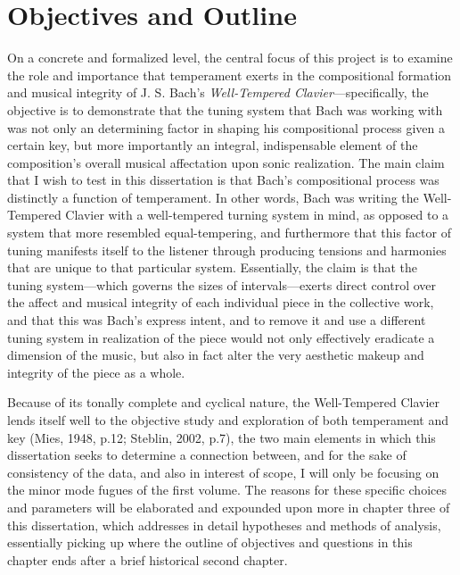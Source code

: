     \section{Objectives and Outline}\label{objectives-and-outline}

On a concrete and formalized level, the central focus of this project is
to examine the role and importance that temperament exerts in the
compositional formation and musical integrity of J. S. Bach's
\emph{Well-Tempered Clavier}---specifically, the objective is to
demonstrate that the tuning system that Bach was working with was not
only an determining factor in shaping his compositional process given a
certain key, but more importantly an integral, indispensable element of
the composition's overall musical affectation upon sonic realization.
The main claim that I wish to test in this dissertation is that Bach's
compositional process was distinctly a function of temperament. In other
words, Bach was writing the Well-Tempered Clavier with a well-tempered
turning system in mind, as opposed to a system that more resembled
equal-tempering, and furthermore that this factor of tuning manifests
itself to the listener through producing tensions and harmonies that are
unique to that particular system. Essentially, the claim is that the
tuning system---which governs the sizes of intervals---exerts direct
control over the affect and musical integrity of each individual piece
in the collective work, and that this was Bach's express intent, and to
remove it and use a different tuning system in realization of the piece
would not only effectively eradicate a dimension of the music, but also
in fact alter the very aesthetic makeup and integrity of the piece as a
whole.

Because of its tonally complete and cyclical nature, the Well-Tempered
Clavier lends itself well to the objective study and exploration of both
temperament and key (Mies, 1948, p.12; Steblin, 2002, p.7), the two main
elements in which this dissertation seeks to determine a connection
between, and for the sake of consistency of the data, and also in
interest of scope, I will only be focusing on the minor mode fugues of
the first volume. The reasons for these specific choices and parameters
will be elaborated and expounded upon more in chapter three of this
dissertation, which addresses in detail hypotheses and methods of
analysis, essentially picking up where the outline of objectives and
questions in this chapter ends after a brief historical second chapter.

